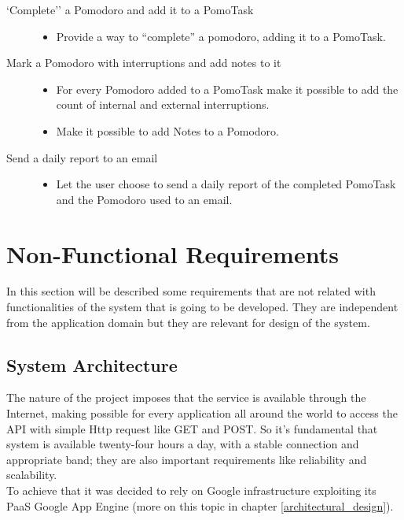 \begin{description}
\begin{itemize}
			\end{itemize}

		\item[`Complete'' a Pomodoro and add it to a PomoTask]\hfill

			\begin{itemize}

				\item Provide a way to ``complete'' a pomodoro, adding it to a PomoTask.

			\end{itemize}

		\item[Mark a Pomodoro with interruptions and add notes to it]\hfill

			\begin{itemize}

				\item For every Pomodoro added to a PomoTask make it possible to add the count of internal and external interruptions.

				\item Make it possible to add Notes to a Pomodoro.

			\end{itemize}

		\item[Send a daily report to an email]\hfill

			\begin{itemize}

				\item Let the user choose to send a daily report of the completed PomoTask and the Pomodoro used to an email.

			\end{itemize}


	\end{description}

	\section{Non-Functional Requirements}

	In this section will be described some requirements that are not related with functionalities of the system that is going to be developed. They are independent from the application domain but they are relevant for design of the system.\\

		\subsection{System Architecture}
		The nature of the project imposes that the service is available through the Internet, making possible for every application all around the world to access the API with simple Http request like GET and POST. So it's fundamental that system is available twenty-four hours a day, with a stable connection and appropriate band; they are also important requirements like reliability and scalability.\\
		To achieve that it was decided to rely on Google infrastructure exploiting its PaaS Google App Engine (more on this topic in chapter \ref{architectural_design}).


